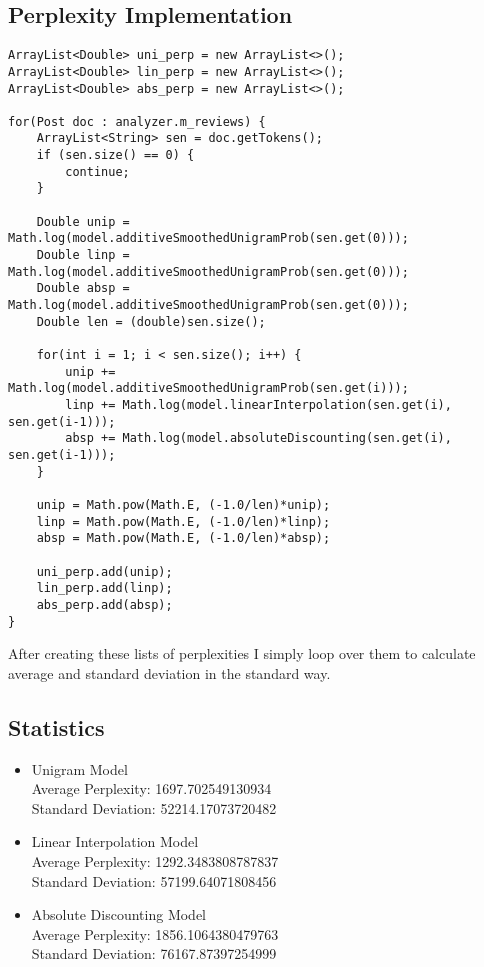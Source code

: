 \documentclass[paper=a4, fontsize=11pt]{jhwhw} %
\begin{document}
\subsection{Perplexity Implementation}
\begin{lstlisting}
ArrayList<Double> uni_perp = new ArrayList<>();
ArrayList<Double> lin_perp = new ArrayList<>();
ArrayList<Double> abs_perp = new ArrayList<>();

for(Post doc : analyzer.m_reviews) {
    ArrayList<String> sen = doc.getTokens();
    if (sen.size() == 0) {
        continue;
    }

    Double unip = Math.log(model.additiveSmoothedUnigramProb(sen.get(0)));
    Double linp = Math.log(model.additiveSmoothedUnigramProb(sen.get(0)));
    Double absp = Math.log(model.additiveSmoothedUnigramProb(sen.get(0)));
    Double len = (double)sen.size();

    for(int i = 1; i < sen.size(); i++) {
        unip += Math.log(model.additiveSmoothedUnigramProb(sen.get(i)));
        linp += Math.log(model.linearInterpolation(sen.get(i), sen.get(i-1)));
        absp += Math.log(model.absoluteDiscounting(sen.get(i), sen.get(i-1)));
    }

    unip = Math.pow(Math.E, (-1.0/len)*unip);
    linp = Math.pow(Math.E, (-1.0/len)*linp);
    absp = Math.pow(Math.E, (-1.0/len)*absp);

    uni_perp.add(unip);
    lin_perp.add(linp);
    abs_perp.add(absp);
}

\end{lstlisting}
After creating these lists of perplexities I simply loop over them to calculate average and standard deviation
in the standard way.

\subsection{Statistics}
\begin{itemize}
\item Unigram Model\\
Average Perplexity: 1697.702549130934\\
Standard Deviation: 52214.17073720482

\item Linear Interpolation Model\\
Average Perplexity: 1292.3483808787837\\
Standard Deviation: 57199.64071808456

\item Absolute Discounting Model\\
Average Perplexity: 1856.1064380479763\\
Standard Deviation: 76167.87397254999
\end{itemize}
\end{document}
